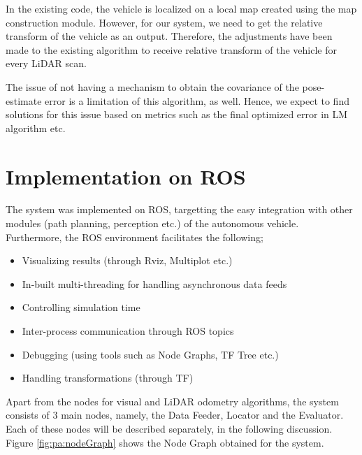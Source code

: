 In the existing code, the vehicle is localized on a local map created using the map construction module. However, for our system, we need to get the relative transform of the vehicle as an output. Therefore, the adjustments have been made to the existing algorithm to receive relative transform of the vehicle for every \gls{LiDAR} scan.

The issue of not having a mechanism to obtain the covariance of the pose-estimate error is a limitation of this algorithm, as well. Hence, we expect to find solutions for this issue based on metrics such as the final optimized error in \gls{LM} algorithm \cite{hi:LM_optimization} etc.












\section{Implementation on \acrlong{ROS}}
The system was implemented on \gls{ROS}, targetting the easy integration with other modules (path planning, perception etc.) of the autonomous vehicle. Furthermore, the \gls{ROS} environment facilitates the following;
\begin{itemize}
	\item Visualizing results (through Rviz, Multiplot etc.)
	\item In-built multi-threading for handling asynchronous data feeds
	\item Controlling simulation time
	\item Inter-process communication through \gls{ROS} topics
	\item Debugging (using tools such as Node Graphs, TF Tree etc.)
	\item Handling transformations (through TF)
\end{itemize}
Apart from the nodes for visual and \gls{LiDAR} odometry algorithms, the system consists of 3 main nodes, namely, the Data Feeder, Locator and the Evaluator. Each of these nodes will be described separately, in the following discussion. Figure \ref{fig:pa:nodeGraph} shows the Node Graph obtained for the system.

